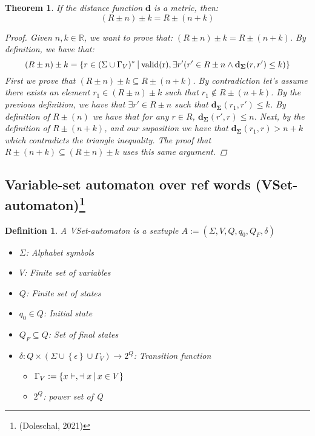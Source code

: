 \documentclass{article}
\newcommand{\set}[1]{\left\{#1\right\}}
\newcommand{\st}{\ \vline \ }
\newcommand{\ra}{\rightarrow}
\newtheorem{theorem}{Theorem}
\newtheorem{definition}{Definition}
\begin{document}
\newpage
\begin{theorem}\label{TheoremMetric}
    If the distance function $\mathbf{d}$ is a metric, then:
    \begin{equation}
        (R\pm n) \pm k = R\pm(n + k)
    \end{equation}
    \begin{proof}
	Given $n, k \in \mathbb{R}$, we want to prove that: $(R\pm
	n )\pm k = R \pm (n + k)$.
    By definition, we have that:
    \begin{equation*}
        (R \pm n) \pm k = \set{r \in (\Sigma \cup \Gamma_V)^* \st  \mathrm{valid(r)}, \exists r' (r'\in R \pm n \land \mathbf{d_\Sigma}(r, r') \leq k)}
    \end{equation*}
    First we prove that $(R \pm n) \pm k \subseteq R \pm (n + k)$.
    By contradiction let's assume there exists an element $r_1 \in
    (R \pm n) \pm k$ such that $r_1 \notin R\pm (n + k)$. By the
    previous definition, we have that $\exists r' \in R\pm n$ such
    that $\mathbf{d_\Sigma}(r_1, r') \leq k$. By definition of $R
    \pm (n)$ we have that for any $r \in R$, $\mathbf{d_\Sigma}(r',
    r) \leq n$. Next, by the definition of $R \pm (n + k)$, and our
    suposition we have that $\mathbf{d_\Sigma}(r_1, r) > n + k$
    which contradicts the triangle inequality. The proof that $R
    \pm (n + k) \subseteq (R \pm n) \pm k$ uses this same argument.

    \end{proof}
\end{theorem}

\subsection*{Variable-set automaton over ref words (VSet-automaton)\footnote{(Doleschal, 2021)}}

\begin{definition}
A VSet-automaton is a sextuple $A:=(\Sigma, V, Q, q_0, Q_F,\delta)$
\begin{itemize}
    \item $\Sigma$: Alphabet symbols
    \item $V$: Finite set of variables
    \item $Q$: Finite set of states
    \item $q_0\in Q$: Initial state
    \item $Q_F\subseteq Q$: Set of final states
    \item $\delta: Q \times (\Sigma\cup\set{\epsilon}\cup\Gamma_V)\ra
          2^Q$: Transition function
        \begin{itemize}
            \item $\Gamma_V:=\set{x\vdash, \dashv x \st x \in V}$
            \item $2^Q$: power set of Q
        \end{itemize}
\end{itemize}
\end{definition}
\end{document}
